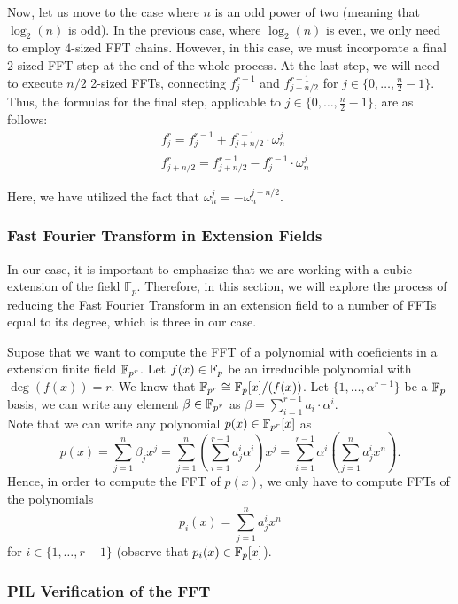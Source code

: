 Now, let us move to the case where $n$ is an odd power of two (meaning that $\log_2(n)$ is odd). In the previous case, where $\log_2(n)$ is even, we only need to employ $4$-sized FFT chains. However, in this case, we must incorporate a final $2$-sized FFT step at the end of the whole process. At the last step, we will need to execute $n/2$ 2-sized FFTs, connecting $f_j^{r-1}$ and $f_{j+n/2}^{r-1}$ for $j \in \{ 0, \ldots, \frac{n}{2}-1 \}$. Thus, the formulas for the final step, applicable to $j \in \{ 0, \ldots, \frac{n}{2}-1 \}$, are as follows:
\begin{align*}
&f_j^{r} = f_j^{r-1} + f_{j+n/2}^{r-1} \cdot \omega_{n}^j \\
&f_{j+n/2}^{r} = f_{j+n/2}^{r-1} - f_{j}^{r-1} \cdot \omega_{n}^j
\end{align*}

Here, we have utilized the fact that $\omega_{n}^j = -\omega_{n}^{j+n/2}$.


\subsubsection{Fast Fourier Transform in Extension Fields}

In our case, it is important to emphasize that we are working with a cubic extension of the field $\mathbb{F}_p$. Therefore, in this section, we will explore the process of reducing the Fast Fourier Transform in an extension field to a number of FFTs equal to its degree, which is three in our case.


Supose that we want to compute the FFT of a polynomial with coeficients in a extension finite field $\mathbb{F}_{p^r}$. Let $f(x)\in\mathbb{F}_p$ be an irreducible polynomial with $\deg(f(x))=r$. We know that $\mathbb{F}_{p^r}\cong \mathbb{F}_{p}[x]/(f(x))$. Let $\{1,\hdots,\alpha^{r-1}\}$ be a $\mathbb{F}_{p}$-basis, we can write any element $\beta\in\mathbb{F}_{p^r}$ as $\beta=\sum_{i=1}^{r-1}a_i\cdot\alpha^{i}$.\\

Note that we can write any polynomial $p(x)\in\mathbb{F}_{p^r}[x]$ as 
\[
p(x)=\sum_{j=1}^{n}\beta_jx^{j}=\sum_{j=1}^{n}\left(\sum_{i=1}^{r-1}a_j^i\alpha^{i}\right)x^{j}=\sum_{i=1}^{r-1}\alpha^i\left( \sum_{j=1}^{n}a_j^ix^n\right).
\]
Hence, in order to compute the FFT of $p(x)$, we only have to compute FFTs of the polynomials 
\[
p_i(x)=\sum_{j=1}^{n}a_j^ix^n
\] 
for $i\in\{1,\hdots,r-1\}$ (observe that $p_i(x)\in\mathbb{F}_p[x]$).


\subsubsection{PIL Verification of the FFT}

